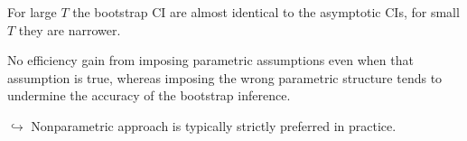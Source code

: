 
For large \(T\) the bootstrap CI are almost identical to the asymptotic CIs, for small \(T\) they are narrower.

No efficiency gain from imposing parametric assumptions even when that assumption is true,
  whereas imposing the wrong parametric structure tends to undermine the accuracy of the bootstrap inference.

\(\hookrightarrow \) Nonparametric approach is typically strictly preferred in practice.
